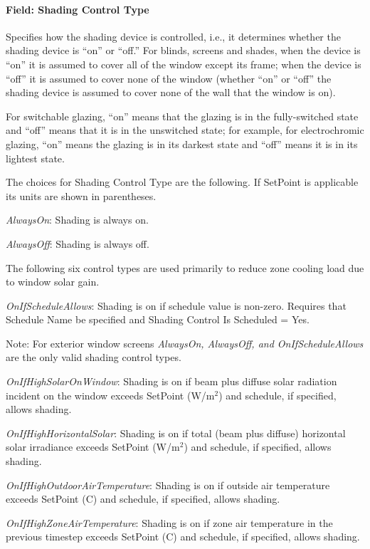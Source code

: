 \paragraph{Field: Shading Control Type}\label{field-shading-control-type}

Specifies how the shading device is controlled, i.e., it determines whether the shading device is ``on'' or ``off.'' For blinds, screens and shades, when the device is ``on'' it is assumed to cover all of the window except its frame; when the device is ``off'' it is assumed to cover none of the window (whether ``on'' or ``off'' the shading device is assumed to cover none of the wall that the window is on).

For switchable glazing, ``on'' means that the glazing is in the fully-switched state and ``off'' means that it is in the unswitched state; for example, for electrochromic glazing, ``on'' means the glazing is in its darkest state and ``off'' means it is in its lightest state.

The choices for Shading Control Type are the following. If SetPoint is applicable its units are shown in parentheses.

\emph{AlwaysOn}: Shading is always on.

\emph{AlwaysOff}: Shading is always off.

The following six control types are used primarily to reduce zone cooling load due to window solar gain.

\emph{OnIfScheduleAllows}: Shading is on if schedule value is non-zero. Requires that Schedule Name be specified and Shading Control Is Scheduled = Yes.

Note: For exterior window screens \emph{AlwaysOn, AlwaysOff, and OnIfScheduleAllows} are the only valid shading control types.

\emph{OnIfHighSolarOnWindow}: Shading is on if beam plus diffuse solar radiation incident on the window exceeds SetPoint (W/m\(^{2}\)) and schedule, if specified, allows shading.

\emph{OnIfHighHorizontalSolar}: Shading is on if total (beam plus diffuse) horizontal solar irradiance exceeds SetPoint (W/m\(^{2}\)) and schedule, if specified, allows shading.

\emph{OnIfHighOutdoorAirTemperature}: Shading is on if outside air temperature exceeds SetPoint (C) and schedule, if specified, allows shading.

\emph{OnIfHighZoneAirTemperature}: Shading is on if zone air temperature in the previous timestep exceeds SetPoint (C) and schedule, if specified, allows shading.

